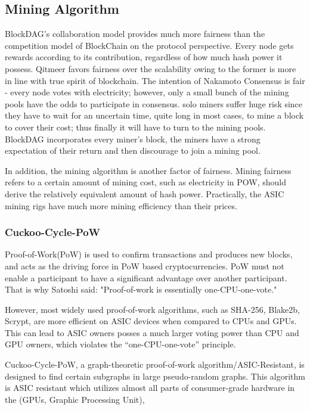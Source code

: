 \documentclass[a4paper,11pt]{article}
\begin{document}
\subsection{Mining Algorithm}
BlockDAG’s collaboration model provides much more fairness than the competition model of BlockChain on the protocol perspective. Every node gets rewards according to its contribution, regardless of how much hash power it possess. Qitmeer favors fairness over the scalability owing to the former is more in line with true spirit of blockchain. The intention of Nakamoto Consensus is fair - every node votes with electricity; however, only a small bunch of the mining pools have the odds to participate in consensus. solo miners suffer huge risk since they have to wait for an uncertain time, quite long in most cases, to mine a block to cover their cost; thus finally it will have to turn to the mining pools. BlockDAG incorporates every miner’s block, the miners have a strong expectation of their return and then discourage to join a mining pool.


In addition, the mining algorithm is  another factor of fairness. Mining fairness refers to a certain amount of mining cost, such as electricity in POW, should derive the relatively equivalent amount of hash power. Practically, the ASIC mining rigs have much more mining efficiency than their prices.

\subsubsection{Cuckoo-Cycle-PoW}
Proof-of-Work(PoW) is used to confirm transactions and produces new blocks, and acts as the driving force in PoW based cryptocurrencies. PoW must not enable a participant to have a significant advantage over another participant. That is why Satoshi said: "Proof-of-work is essentially one-CPU-one-vote."

However, most widely used proof-of-work algorithms, such as SHA-256, Blake2b, Scrypt, are more efficient on ASIC devices when compared to CPUs and GPUs. This can lead to ASIC owners posses a much larger voting power than CPU and GPU owners, which violates the “one-CPU-one-vote” principle.

Cuckoo-Cycle-PoW, a graph-theoretic proof-of-work algorithm/ASIC-Resistant, is designed to find certain subgraphs in large pseudo-random graphs. This algorithm is ASIC resistant which  utilizes almost all parts of consumer-grade hardware in the  (GPUs, Graphic Processing Unit),
\end{document}
